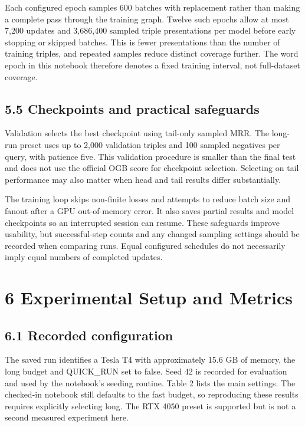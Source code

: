 \documentclass[11pt]{article}
\begin{document}
Each configured epoch samples 600 batches with replacement rather than making a complete pass through the training graph. Twelve such epochs allow at most 7,200 updates and 3,686,400 sampled triple presentations per model before early stopping or skipped batches. This is fewer presentations than the number of training triples, and repeated samples reduce distinct coverage further. The word epoch in this notebook therefore denotes a fixed training interval, not full-dataset coverage.

\subsection*{5.5 Checkpoints and practical safeguards}
Validation selects the best checkpoint using tail-only sampled MRR. The long-run preset uses up to 2,000 validation triples and 100 sampled negatives per query, with patience five. This validation procedure is smaller than the final test and does not use the official OGB score for checkpoint selection. Selecting on tail performance may also matter when head and tail results differ substantially.

The training loop skips non-finite losses and attempts to reduce batch size and fanout after a GPU out-of-memory error. It also saves partial results and model checkpoints so an interrupted session can resume. These safeguards improve usability, but successful-step counts and any changed sampling settings should be recorded when comparing runs. Equal configured schedules do not necessarily imply equal numbers of completed updates.

\section*{6 Experimental Setup and Metrics}
\subsection*{6.1 Recorded configuration}
The saved run identifies a Tesla T4 with approximately 15.6 GB of memory, the long budget and QUICK\_RUN set to false. Seed 42 is recorded for evaluation and used by the notebook's seeding routine. Table 2 lists the main settings. The checked-in notebook still defaults to the fast budget, so reproducing these results requires explicitly selecting long. The RTX 4050 preset is supported but is not a second measured experiment here.
\end{document}
